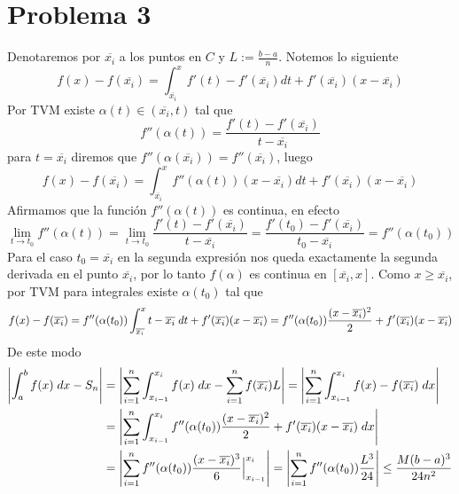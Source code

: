 \documentclass{article}
\begin{document}
\section*{Problema 3}
\noindent Denotaremos por $\overline{x_{i}}$ a los puntos en $C$ y $L:=\frac{b-a}{n}$. Notemos lo
siguiente
\begin{equation*}
    f(x)-f(\overline{x_{i}})=\int_{\overline{x_{i}}}^{x}f'(t)-f'(\overline{x_{i}})dt+
    f'(\overline{x_{i}})(x-\overline{x_{i}})
\end{equation*}
Por TVM existe $\alpha(t)\in(\overline{x_{i}},t)$ tal que
\begin{equation*}
    f''(\alpha(t))=\frac{f'(t)-f'(\overline{x_{i}})}{t-\overline{x_{i}}}
\end{equation*}
para $t=\overline{x_{i}}$ diremos que $f''(\alpha(\overline{x_{i}}))=f''(\overline{x_{i}})$, luego
\begin{equation*}
    f(x)-f(\overline{x_{i}})=\int_{\overline{x_{i}}}^{x}f''(\alpha(t))(x-\overline{x_{i}})dt+
    f'(\overline{x_{i}})(x-\overline{x_{i}})
\end{equation*}
Afirmamos que la función $f''(\alpha(t))$ es continua, en efecto
\begin{equation*}
    \lim_{t\to t_{0}}f''(\alpha(t))=\lim_{t\to t_{0}}\frac{f'(t)-f'(\overline{x_{i}})}
    {t-\overline{x_{i}}}=\frac{f'(t_{0})-f'(\overline{x_{i}})}
    {t_{0}-\overline{x_{i}}}=f''(\alpha(t_{0}))
\end{equation*}
Para el caso $t_{0}=\overline{x_{i}}$ en la segunda expresión nos queda exactamente la segunda 
derivada en el punto $\overline{x_{i}}$, por lo tanto $f(\alpha)$ es continua en 
$[\overline{x_{i}},x]$. Como $x\geq\overline{x_{i}}$, por TVM para integrales existe 
$\alpha(t_{0})$ tal que
\begin{equation*}
    f(x)-f(\overline{x_{i}})=f''(\alpha(t_{0}))\int_{\overline{x_{i}}}^{x}t-\overline{x_{i}}
    \hspace{1mm}dt+f'(\overline{x_{i}})(x-\overline{x_{i}})=f''(\alpha(t_{0}))
    \frac{(x-\overline{x_{i}})^{2}}{2}+f'(\overline{x_{i}})(x-\overline{x_{i}})
\end{equation*}
De este modo
\begin{align*}
    \left|\int_{a}^{b}f(x)\hspace{1mm}dx-S_{n} \right| &= \left|\sum_{i=1}^{n}\int_{x_{i-1}}^{x_{i}}f(x)
    \hspace{1mm}dx-\sum_{i=1}^{n}f(\overline{x_{i}})L \right|=\left|\sum_{i=1}^{n}\int_{x_{i-1}}^{x_{i}}
    f(x)-f(\overline{x_{i}})\hspace{1mm}dx \right| \\
    &= \left|\sum_{i=1}^{n}\int_{x_{i-1}}^{x_{i}}f''(\alpha(t_{0}))\frac{(x-\overline{x_{i}})^{2}}
    {2}+f'(\overline{x_{i}})(x-\overline{x_{i}})\hspace{1mm}dx \right| \\
    &= \left|\sum_{i=1}^{n}f''(\alpha(t_{0}))\frac{(x-\overline{x_{i}})^{3}}{6}
    \Big|_{x_{i-1}}^{x_{i}} \right|=\left|\sum_{i=1}^{n}f''(\alpha(t_{0}))\frac{L^{3}}{24} \right|\leq
    \frac{M(b-a)^{3}}{24n^{2}}
\end{align*}
\end{document}
